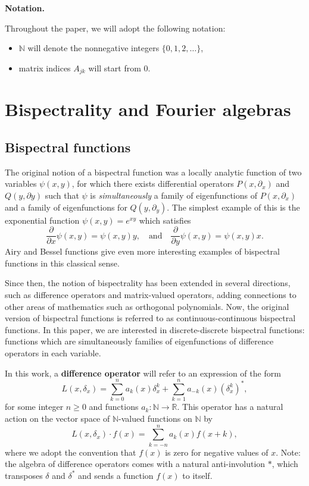 \documentclass[11pt]{amsart}
\theoremstyle{plain}
\newcommand{\cleqn}{\setcounter{equation}{0}}
\newcommand{\clth}{\setcounter{theorem}{0}}
\newcommand {\sectionnew}[1]{\section{#1}\cleqn\clth}
\theoremstyle{named}
\newcommand{\vocab}[1]{\textbf{#1}}
\begin{document}
\smallskip

\noindent
{\bf{Notation.}} {
Throughout the paper, we will adopt the following notation:
\begin{itemize}
\item $\mathbb{N}$ will denote the nonnegative integers $\{0,1,2,\dots\}$,
\item matrix indices $A_{jk}$ will start from $0$.
\end{itemize}
}


\sectionnew{Bispectrality and Fourier algebras}
\subsection{Bispectral functions}
The original notion of a bispectral function was a locally analytic function of two variables $\psi(x,y)$, for which there exists differential operators $P(x,\partial_x)$ and $Q(y,\partial y)$ such that $\psi$ is \emph{simultaneously} a family of eigenfunctions of $P(x,\partial_x)$ and a family of eigenfunctions for $Q(y,\partial_y)$.
The simplest example of this is the exponential function $\psi(x,y) = e^{xy}$ which satisfies
$$\frac{\partial}{\partial x} \psi(x,y) = \psi(x,y)y,\quad\text{and}\quad \frac{\partial}{\partial y} \psi(x,y) = \psi(x,y)x.$$
Airy and Bessel functions give even more interesting examples of bispectral functions in this classical sense.

Since then, the notion of bispectrality has been extended in several directions, such as difference operators and matrix-valued operators, adding connections to other areas of mathematics such as orthogonal polynomials.
Now, the original version of bispectral functions is referred to as continuous-continuous bispectral functions.
In this paper, we are interested in discrete-discrete bispectral functions: functions which are simultaneously families of eigenfunctions of difference operators in each variable.

In this work, a \vocab{difference operator} will refer to an expression of the form
$$L(x,\delta_x) = \sum_{k=0}^n a_k(x)\delta_x^k + \sum_{k=1}^{n} a_{-k}(x)(\delta_x^k)^*,$$
for some integer $n\geq 0$ and functions $a_k: \mathbb{N}\rightarrow\mathbb{R}$.
This operator has a natural action on the vector space of $\mathbb{N}$-valued functions on $\mathbb{N}$ by
$$L(x,\delta_x)\cdot f(x) = \sum_{k=-n}^n a_k(x)f(x+k),$$
where we adopt the convention that $f(x)$ is zero for negative values of $x$.
Note: the algebra of difference operators comes with a natural anti-involution $*$, which transposes $\delta$ and $\delta^*$ and sends a function $f(x)$ to itself.
\end{document}
